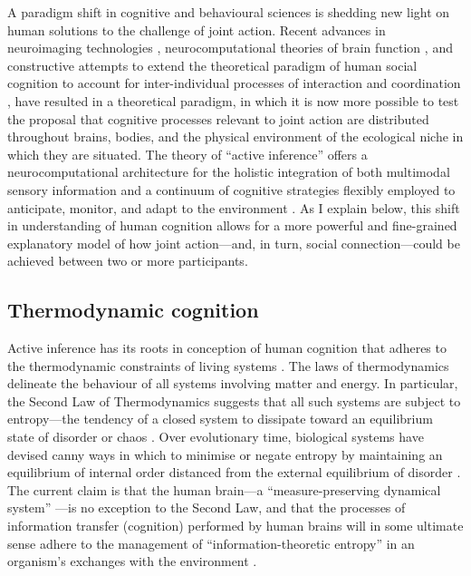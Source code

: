 \begin{CJK}{UTF8}{gbsn}
A paradigm shift in cognitive and behavioural sciences is shedding new light on human solutions to the challenge of joint action.  Recent advances in neuroimaging technologies \citep{Frith2007}, neurocomputational theories of brain function \citep{Friston2010,Frith2010,Yufik2013,Clark2013}, and constructive attempts to extend the theoretical paradigm of human social cognition to account for inter-individual processes of interaction and coordination \citep{Sebanz2006,Dale2014}, have resulted in a theoretical paradigm, in which it is now more possible to test the proposal that cognitive processes relevant to joint action are distributed throughout brains, bodies, and the physical environment of the ecological niche in which they are situated.  The theory of ``active inference'' \citep{Friston2010} offers a neurocomputational architecture for the holistic integration of both multimodal sensory information and a continuum of cognitive strategies flexibly employed to anticipate, monitor, and adapt to the environment \citep{Clark2015}.  As I explain below, this shift in understanding of human cognition allows for a more powerful and fine-grained explanatory model of how joint action---and, in turn, social connection---could be achieved between two or more participants.


\subsection{Thermodynamic cognition\label{sect:thermoCog}}

Active inference has its roots in conception of human cognition that adheres to the thermodynamic constraints of living systems \citep{Yufik2017}.  The laws of thermodynamics delineate the behaviour of all systems involving matter and energy.  In particular, the Second Law of Thermodynamics suggests that all such systems are subject to entropy---the tendency of a closed system to dissipate toward an equilibrium state of disorder or chaos \citep{Wolfram2002}.  Over evolutionary time, biological systems have devised canny ways in which to minimise or negate entropy by maintaining an equilibrium of internal order distanced from the external equilibrium of disorder \citep{Schrodinger1944}.  The current claim is that the human brain---a ``measure-preserving dynamical system'' \citep[c.f.][]{Friston2013}---is no exception to the Second Law, and that the processes of information transfer (cognition) performed by human brains will in some ultimate sense adhere to the management of ``information-theoretic entropy'' in an organism's exchanges with the environment \citep{Yufik2002,Yufik2013,Friston2010,Sengupta2013,Sengupta2016,Sengupta2017}.


\end{CJK}
